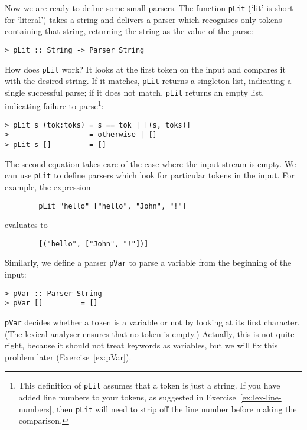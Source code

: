 Now we are ready to define some small parsers.  The function \mbox{\tt pLit}
(`lit' is short for
`literal') takes
a string and delivers a parser which recognises only tokens containing
that string, returning the string as the value of the parse:
\begin{verbatim}
> pLit :: String -> Parser String
\end{verbatim}
%
How does \mbox{\tt pLit} work?  It looks at the first token on the input and
compares it with the desired string.  If it matches, \mbox{\tt pLit} returns
a singleton list, indicating a single successful parse; if it does
not match, \mbox{\tt pLit} returns an empty list, indicating failure
to parse\footnote{%
This definition of \mbox{\tt pLit} assumes that a token is just a string.
If you have added line numbers to your tokens, as suggested in
Exercise~\ref{ex:lex-line-numbers}, then \mbox{\tt pLit} will need to strip off the
line number before making the comparison.
}:
\begin{verbatim}
> pLit s (tok:toks) = s == tok | [(s, toks)]
>                   = otherwise | []
> pLit s []         = []
\end{verbatim}
%
%
The second equation takes care of the case where the input stream is empty.
We can use \mbox{\tt pLit} to define parsers which look for particular tokens
in the input.  For example, the expression
\begin{verbatim}
        pLit "hello" ["hello", "John", "!"]
\end{verbatim}
evaluates to
\begin{verbatim}
        [("hello", ["John", "!"])]
\end{verbatim}
Similarly, we define a parser \mbox{\tt pVar} to parse a variable from the beginning
of the input:
\begin{verbatim}
> pVar :: Parser String
> pVar []         = []
\end{verbatim}
%
%
\mbox{\tt pVar} decides whether a token is a variable or not by looking at its
first character.  (The lexical analyser ensures that no token is empty.)
Actually, this is not quite right, because it should not treat keywords as
variables, but we will fix this problem later (Exercise~\ref{ex:pVar}).

